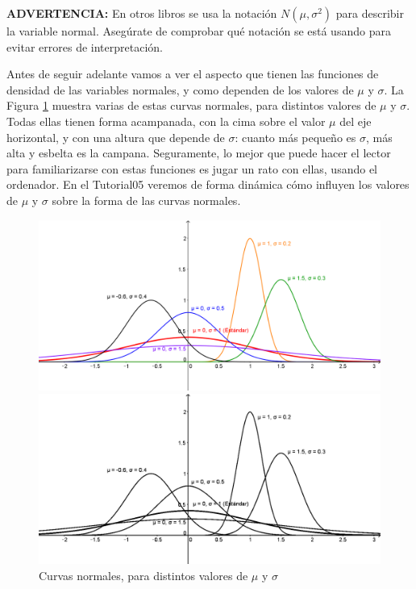{\bf ADVERTENCIA:} En otros libros se usa la notación $N(\mu,\sigma^2)$ para describir la variable normal. Asegúrate de comprobar qué notación se está usando para evitar errores de interpretación.

Antes de seguir adelante vamos a ver el aspecto que tienen las funciones de densidad de las variables normales, y como dependen de los valores de $\mu$ y $\sigma$.  La Figura \ref{cap05:fig:curvasnormales-02} muestra varias de estas curvas normales, para distintos valores de $\mu$ y $\sigma$. Todas ellas tienen forma acampanada, con la cima sobre el valor $\mu$ del eje horizontal, y con una altura que depende de $\sigma$: cuanto más pequeño es $\sigma$, más alta y esbelta es la campana. Seguramente, lo mejor que puede hacer el lector para familiarizarse con estas funciones es jugar un rato con ellas, usando el ordenador. En el Tutorial05 veremos de forma dinámica cómo influyen los valores de $\mu$ y $\sigma$ sobre la forma de las curvas normales.
\begin{figure}[htbp]
\begin{center}
\begin{enColor}
\includegraphics[width=13cm]{../fig/cap05-curvasnormales-02.png}
\end{enColor}
\begin{bn}
\includegraphics[width=13cm]{../fig/cap05-curvasnormales-02-bn.png}
\end{bn}
\caption{Curvas normales, para distintos valores de $\mu$ y $\sigma$}
\label{cap05:fig:curvasnormales-02}
\end{center}
\end{figure}

